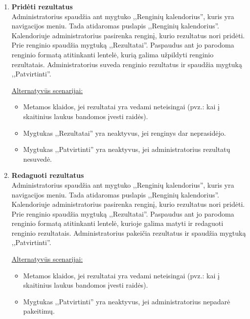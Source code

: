 \documentclass{VUMIFPSkursinis}
\begin{document}
\begin{enumerate} [label = \textbf{U\arabic*.}]
					\underline{Alternatyvūs scenarijai:}
					\begin{itemize}
						\item Jei administratorius atsiradus dialogui atšaukia ištrinimą, dialogas pašalinamas ir parodomas renginio puslapis.
					\end{itemize}
				
			\item \textbf{Pridėti rezultatus}   \\
					Administratorius spaudžia ant mygtuko ,,Renginių kalendorius'', kuris yra navigacijos meniu. Tada atidaromas puslapis ,,Renginių kalendorius''. Kalendoriuje administratorius pasirenka renginį, kurio rezultatus nori pridėti. Prie renginio spaudžia mygtuką ,,Rezultatai''. Paspaudus ant jo parodoma renginio formatą atitinkanti lentelė, kurią galima užpildyti renginio rezultatais. Administratorius suveda renginio rezultatus ir spaudžia mygtuką ,,Patvirtinti''.
					
					\underline{Alternatyvūs scenarijai:}
					\begin{itemize}
						\item Metamos klaidos, jei rezultatai yra vedami neteisingai (pvz.: kai į skaitinius laukus bandomos įvesti raidės).
						\item Mygtukas ,,Rezultatai'' yra neaktyvus, jei renginys dar neprasidėjo.
						\item Mygtukas ,,Patvirtinti'' yra neaktyvus, jei administratorius rezultatų nesuvedė.
					\end{itemize}
					
			\item \textbf{Redaguoti rezultatus}   \\
					Administratorius spaudžia ant mygtuko ,,Renginių kalendorius'', kuris yra navigacijos meniu. Tada atidaromas puslapis ,,Renginių kalendorius''. Kalendoriuje administratorius pasirenka renginį, kurio rezultatus nori pridėti. Prie renginio spaudžia mygtuką ,,Rezultatai''. Paspaudus ant jo parodoma renginio formatą atitinkanti lentelė, kurioje galima matyti ir redaguoti renginio rezultatais. Administratorius pakeičia rezultatus ir spaudžia mygtuką ,,Patvirtinti''.
					
					\underline{Alternatyvūs scenarijai:}
					\begin{itemize}
						\item Metamos klaidos, jei rezultatai yra vedami neteisingai (pvz.: kai į skaitinius laukus bandomos įvesti raidės).
						\item Mygtukas ,,Patvirtinti'' yra neaktyvus, jei administratorius nepadarė pakeitimų.
					\end{itemize}
				

\end{enumerate}
\end{document}
